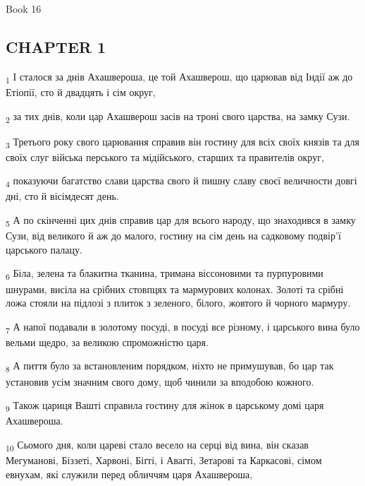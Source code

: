 Book 16
\subsection{CHAPTER 1}
\begin{tcolorbox}
\textsubscript{1} І сталося за днів Ахашвероша, це той Ахашверош, що царював від Індії аж до Етіопії, сто й двадцять і сім округ,
\end{tcolorbox}
\begin{tcolorbox}
\textsubscript{2} за тих днів, коли цар Ахашверош засів на троні свого царства, на замку Сузи.
\end{tcolorbox}
\begin{tcolorbox}
\textsubscript{3} Третього року свого царювання справив він гостину для всіх своїх князів та для своїх слуг війська перського та мідійського, старших та правителів округ,
\end{tcolorbox}
\begin{tcolorbox}
\textsubscript{4} показуючи багатство слави царства свого й пишну славу своєї величности довгі дні, сто й вісімдесят день.
\end{tcolorbox}
\begin{tcolorbox}
\textsubscript{5} А по скінченні цих днів справив цар для всього народу, що знаходився в замку Сузи, від великого й аж до малого, гостину на сім день на садковому подвір'ї царського палацу.
\end{tcolorbox}
\begin{tcolorbox}
\textsubscript{6} Біла, зелена та блакитна тканина, тримана віссоновими та пурпуровими шнурами, висіла на срібних стовпцях та мармурових колонах. Золоті та срібні ложа стояли на підлозі з плиток з зеленого, білого, жовтого й чорного мармуру.
\end{tcolorbox}
\begin{tcolorbox}
\textsubscript{7} А напої подавали в золотому посуді, в посуді все різному, і царського вина було вельми щедро, за великою спроможністю царя.
\end{tcolorbox}
\begin{tcolorbox}
\textsubscript{8} А пиття було за встановленим порядком, ніхто не примушував, бо цар так установив усім значним свого дому, щоб чинили за вподобою кожного.
\end{tcolorbox}
\begin{tcolorbox}
\textsubscript{9} Також цариця Вашті справила гостину для жінок в царському домі царя Ахашвероша.
\end{tcolorbox}
\begin{tcolorbox}
\textsubscript{10} Сьомого дня, коли цареві стало весело на серці від вина, він сказав Мегуманові, Біззеті, Харвоні, Біґті, і Аваґті, Зетарові та Каркасові, сімом евнухам, які служили перед обличчям царя Ахашвероша,
\end{tcolorbox}
